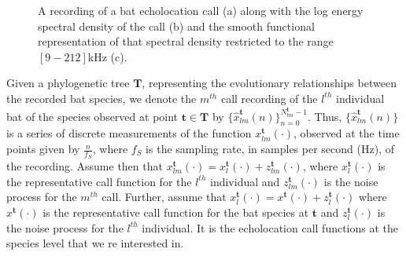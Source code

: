 \documentclass{ws-rv9x6}
\begin{document}
\begin{figure}
	\centering
	\caption{A recording of a bat echolocation call (a) along with the log energy spectral density of the call (b) and the smooth functional representation of that spectral density restricted to the range \([9-212]\)kHz (c).}
\end{figure}

Given a phylogenetic tree \(\mathbf{T}\), representing the evolutionary relationships between the recorded bat species, we denote the \(m^{th}\) call recording of the \(l^{th}\) individual bat of the species observed at point \(\mathbf{t} \in \mathbf{T}\) by \(\{\hat{x}_{lm}^{\mathbf{t}}(n)\}_{n=0}^{N_{lm}^{\mathbf{t}} - 1}\). 
Thus, \(\{\hat{x}_{lm}^{\mathbf{t}}(n)\}\) is a series of discrete measurements of the function \(x_{lm}^{\mathbf{t}}(\cdot)\), observed at the time points given by \(\frac{n}{f_S}\), where \(f_S\) is the sampling rate, in samples per second (Hz), of the recording. Assume then that \(x_{lm}^{\mathbf{t}}(\cdot) = x_{l}^{\mathbf{t}}(\cdot) + z_{lm}^{\mathbf{t}}(\cdot)\), where \(x_{l}^{\mathbf{t}}(\cdot)\) is the representative call function for the \(l^{th}\) individual and \(z_{lm}^{\mathbf{t}}(\cdot)\) is the noise process for the \(m^{th}\) call. Further, assume that \(x_{l}^{\mathbf{t}}(\cdot) = x^{\mathbf{t}}(\cdot) + z_{l}^{\mathbf{t}}(\cdot)\) where \(x^{\mathbf{t}}(\cdot)\) is the representative call function for the bat species at \({\mathbf{t}}\) and \(z_{l}^{\mathbf{t}}(\cdot)\) is the noise process for the \(l^{th}\) individual. It is the echolocation call functions at the species level that we re interested in.
\end{document}
